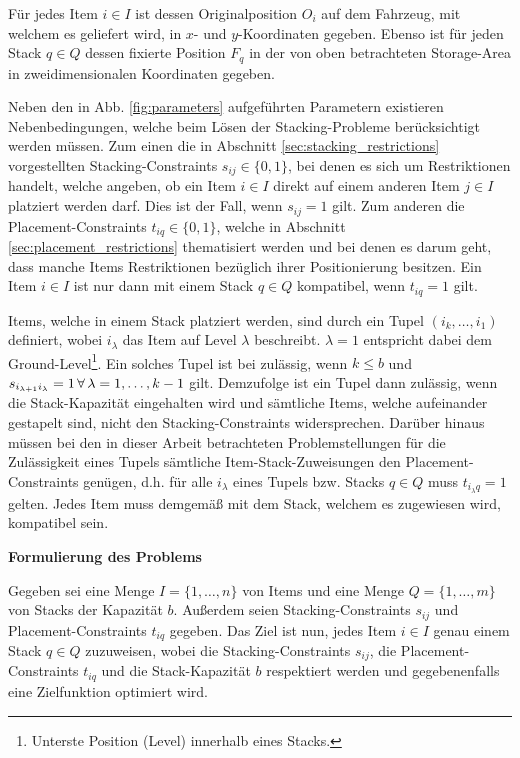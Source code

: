 \pagebreak

Für jedes Item $i \in I$ ist dessen Originalposition $O_i$ auf dem Fahrzeug, mit welchem es geliefert wird,
in $x$- und $y$-Koordinaten gegeben. Ebenso ist für jeden Stack $q \in Q$ dessen fixierte Position $F_q$ in der von oben betrachteten Storage-Area in zweidimensionalen Koordinaten gegeben.

Neben den in Abb. \ref{fig:parameters} aufgeführten Parametern existieren Nebenbedingungen, welche beim Lösen der Stacking-Probleme
berücksichtigt werden müssen. Zum einen die in Abschnitt \ref{sec:stacking_restrictions} vorgestellten Stacking-Constraints
$s_{ij} \in \{0, 1\}$, bei denen es sich um Restriktionen handelt, welche angeben, ob ein Item $i \in I$ direkt auf einem anderen Item $j \in I$ platziert werden darf. Dies ist der Fall, wenn $s_{ij} = 1$ gilt.
Zum anderen die Placement-Constraints $t_{iq} \in \{0, 1\}$, welche in Abschnitt \ref{sec:placement_restrictions} thematisiert werden und bei denen es darum geht, dass manche Items Restriktionen bezüglich ihrer Positionierung besitzen. Ein Item $i \in I$ ist nur dann mit einem Stack $q \in Q$ kompatibel, wenn $t_{iq} = 1$ gilt.

Items, welche in einem Stack platziert werden, sind durch ein Tupel $(i_k, \dotsc, i_1)$ definiert, wobei
$i_\lambda$ das Item auf Level $\lambda$ beschreibt. $\lambda = 1$ entspricht dabei dem
Ground-Level\footnote{Unterste Position (Level) innerhalb eines Stacks.}.
Ein solches Tupel ist bei \citet{Bruns2015} zulässig, wenn $k \leq b$ und $s_{i_{\lambda + 1} i_\lambda} = 1
\thinspace \forall \thinspace \lambda = 1, \dotsc, k - 1$ gilt.
Demzufolge ist ein Tupel dann zulässig, wenn die Stack-Kapazität eingehalten wird und sämtliche Items,
welche aufeinander gestapelt sind, nicht den Stacking-Constraints widersprechen. Darüber hinaus müssen bei den in dieser
Arbeit betrachteten Problemstellungen für die Zulässigkeit eines Tupels sämtliche Item-Stack-Zuweisungen
den Placement-Constraints genügen, d.h. für alle $i_\lambda$ eines Tupels bzw. Stacks $q \in Q$ muss
$t_{i_\lambda q} = 1$ gelten. Jedes Item muss demgemäß mit dem Stack, welchem es zugewiesen wird, kompatibel sein.
\newline

\textbf{Formulierung des Problems}

Gegeben sei eine Menge $I = \{1, \dotsc, n\}$ von Items und eine Menge $Q = \{1, \dotsc, m\}$ von Stacks der Kapazität $b$.
Außerdem seien Stacking-Constraints $s_{ij}$ und Placement-Constraints $t_{iq}$ gegeben.
Das Ziel ist nun, jedes Item $i \in I$ genau einem Stack $q \in Q$ zuzuweisen, wobei die Stacking-Constraints $s_{ij}$,
die Placement-Constraints $t_{iq}$ und die Stack-Kapazität $b$ respektiert werden und gegebenenfalls eine Zielfunktion
optimiert wird.


